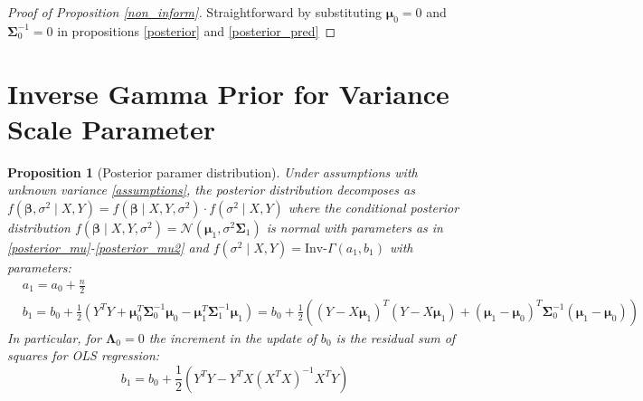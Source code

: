 \documentclass[10pt,fleqn]{amsart}
\newtheorem{proposition}[theorem]{Proposition}
\theoremstyle{definition}
\theoremstyle{remark}
\numberwithin{equation}{section}
\newcommand{\bbeta}{\boldsymbol{\beta}}
\newcommand{\mmu}{\boldsymbol{\mu}}
\newcommand{\SSigma}{\boldsymbol{\Sigma}}
\newcommand{\LLambda}{\boldsymbol{\Lambda}}
\newcommand{\XTY}{X^TY}
\newcommand{\XTXi}{\left(X^TX\right)^{-1}}
\newcommand{\invGamma}{\text{Inv-}\Gamma}
\begin{document}
\begin{proof}[Proof of Proposition \ref{non_inform}]
Straightforward by substituting $\mmu_0=0$ and $\SSigma_0^{-1}=0$ in propositions \ref{posterior} and \ref{posterior_pred}
\end{proof}

\section{Inverse Gamma Prior for Variance Scale Parameter}
\begin{proposition}[Posterior paramer distribution]\label{posterior_var}
    Under assumptions with unknown variance \ref{assumptions}, the posterior distribution decomposes as
    $f\left(\bbeta,\sigma^2\mid X, Y\right)=f\left(\bbeta\mid X, Y, \sigma^2\right)\cdot f\left(\sigma^2\mid X, Y\right)$ where the conditional posterior distribution $f(\bbeta\mid X, Y, \sigma^2)=\mathcal{N}(\mmu_1, \sigma^2\SSigma_1)$
    is normal with parameters as in \ref{posterior_mu}-\ref{posterior_mu2} and $f\left(\sigma^2\mid X, Y\right)=\invGamma\left(a_1, b_1\right)$
    with parameters:
    \begin{align}
        \label{posterior_sigsq}&a_1=a_0+\frac n 2&&\\
        \label{posterior_sigsq2}&b_1=b_0+\frac 12\left(Y^TY+\mmu_0^T\SSigma_0^{-1}\mmu_0-\mmu_1^T\SSigma_1^{-1}\mmu_1\right)=
        b_0+\frac 12\left(\left(Y-X\mmu_1\right)^T\left(Y-X\mmu_1\right)+\left(\mmu_1-\mmu_0\right)^T\SSigma_0^{-1}\left(\mmu_1-\mmu_0\right)\right)&&
    \end{align}
    In particular, for $\LLambda_0=0$ the increment in the update of $b_0$ is the residual sum of squares for OLS regression:
    \begin{equation*}
        b_1=b_0+\frac 12 \left(Y^TY-Y^TX\XTXi\XTY\right)
    \end{equation*}
\end{proposition}
\end{document}
